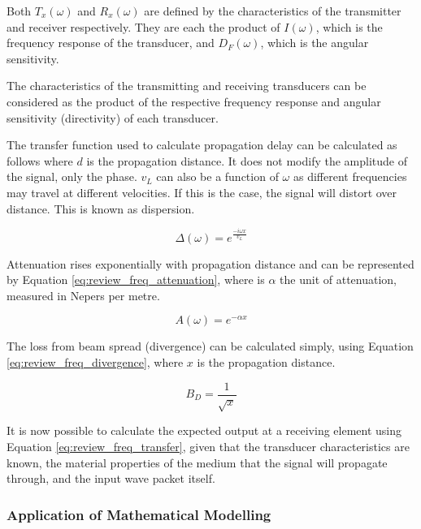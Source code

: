 Both $T_x(\omega)$ and $R_x(\omega)$ are defined by the characteristics of the transmitter and receiver respectively. They are each the product of $I(\omega)$, which is the frequency response of the transducer, and $D_F(\omega)$, which is the angular sensitivity.

The characteristics of the transmitting and receiving transducers can be considered as the product of the respective frequency response and angular sensitivity (directivity) of each transducer.

The transfer function used to calculate propagation delay can be calculated as follows where $d$ is the propagation distance. It does not modify the amplitude of the signal, only the phase. $v_L$ can also be a function of $\omega$ as different frequencies may travel at different velocities. If this is the case, the signal will distort over distance. This is known as dispersion.

\begin{equation} \label{eq:review_freq_delay}
\Delta(\omega) = e^{\frac{-i\omega x}{v_L}}
\end{equation}

Attenuation rises exponentially with propagation distance and can be represented by Equation \ref{eq:review_freq_attenuation}, where is $\alpha$ the unit of attenuation, measured in Nepers per metre.

\begin{equation} \label{eq:review_freq_attenuation}
A(\omega) = e^{-\alpha x}
\end{equation}

The loss from beam spread (divergence) can be calculated simply, using Equation \ref{eq:review_freq_divergence}, where $x$ is the propagation distance.

\begin{equation} \label{eq:review_freq_divergence}
B_D = \frac{1}{\sqrt{x}}
\end{equation}

It is now possible to calculate the expected output at a receiving element using Equation \ref{eq:review_freq_transfer}, given that the transducer characteristics are known, the material properties of the medium that the signal will propagate through, and the input wave packet itself.

\subsubsection{Application of Mathematical Modelling}

